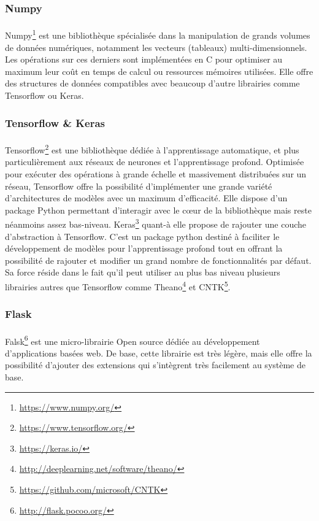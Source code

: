 		\subsubsection*{Numpy}
		\paragraph{}
		Numpy\footnote{\url{https://www.numpy.org/}} est une bibliothèque spécialisée dans la manipulation de grands volumes de données numériques, notamment les vecteurs (tableaux) multi-dimensionnels. Les opérations sur ces derniers sont implémentées en C pour optimiser au maximum leur coût en temps de calcul ou ressources mémoires utilisées. Elle offre des structures de données compatibles avec beaucoup d'autre librairies comme Tensorflow ou Keras.
		
		\subsubsection*{Tensorflow \& Keras}\label{tf&keras}
		\paragraph{}
		Tensorflow\footnote{\url{https://www.tensorflow.org/}} est une bibliothèque dédiée à l'apprentissage automatique, et plus particulièrement aux réseaux de neurones et l'apprentissage profond. Optimisée pour exécuter des opérations à grande échelle et massivement distribuées sur un réseau, Tensorflow offre la possibilité d'implémenter une grande variété d'architectures de modèles avec un maximum d'efficacité. Elle dispose d'un package Python permettant d'interagir avec le c\oe{}ur de la bibliothèque mais reste néanmoins assez bas-niveau. Keras\footnote{\url{https://keras.io/}} quant-à elle propose de rajouter une couche d'abstraction à Tensorflow. C'est un package python destiné à faciliter le développement de modèles pour l'apprentissage profond tout en offrant la possibilité de rajouter et modifier un grand nombre de fonctionnalités par défaut. Sa force réside dans le fait qu'il peut utiliser au plus bas niveau plusieurs librairies autres que Tensorflow comme Theano\footnote{\url{http://deeplearning.net/software/theano/}} et CNTK\footnote{\url{https://github.com/microsoft/CNTK}}.
		
		\subsubsection*{Flask}
		\paragraph{}
		Falsk\footnote{\url{http://flask.pocoo.org/}} est une micro-librairie Open source dédiée au développement d'applications basées web. De base, cette librairie est très légère, mais elle offre la possibilité d'ajouter des extensions qui s'intègrent très facilement au système de base.
		
